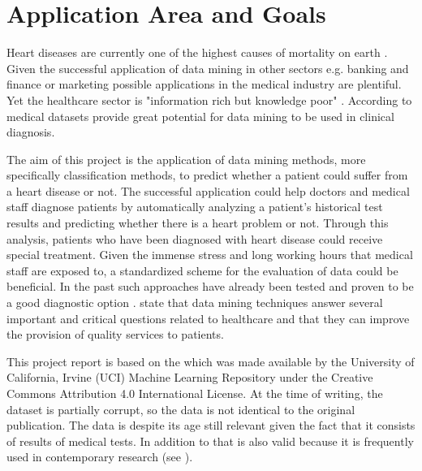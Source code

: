 \section{Application Area and Goals} \label{sec:applicationAreaGoals}

Heart diseases are currently one of the highest causes of mortality on earth \citep{nahar2013, kavitha2016, statistischesbundesamt2020}.
Given the successful application of data mining in other sectors e.g. banking and finance or marketing \citep{keles2017} possible applications in the medical industry are plentiful. Yet the healthcare sector is "information rich but knowledge poor" \citep{soni2011}. According to \citet{soni2011} medical datasets provide great potential for data mining to be used in clinical diagnosis.


The aim of this project is the application of data mining methods, more specifically classification methods, to predict whether a patient could suffer from a heart disease or not. The successful application could help doctors and medical staff diagnose patients by automatically analyzing a patient's historical test results and predicting whether there is a heart problem or not. Through this analysis, patients who have been diagnosed with heart disease could receive special treatment. Given the immense stress and long working hours that medical staff are exposed to, a standardized scheme for the evaluation of data could be beneficial. 
In the past such approaches have already been tested and proven to be a good diagnostic option \citep{usharani2011}. \citet{jabbar2013} state that data mining techniques answer several important and critical questions related to healthcare and that they can improve the provision of quality services to patients.

This project report is based on the  \citep{janosi1988} which was made available by the University of California, Irvine (UCI) Machine Learning Repository under the Creative Commons Attribution 4.0 International License. At the time of writing, the dataset is partially corrupt, so the data is not identical to the original publication. The data is despite its age still relevant given the fact that it consists of results of medical tests. In addition to that is also valid because it is frequently used in contemporary research (see \cite{usharani2011, aha1988, nahar2013}). 